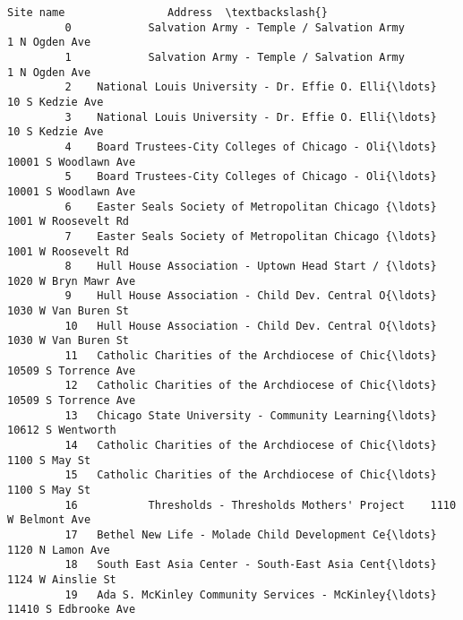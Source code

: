 \documentclass[11pt]{article}
\begin{document}
\begin{Verbatim}[commandchars=\\\{\}]
                                                     Site name                Address  \textbackslash{}
         0            Salvation Army - Temple / Salvation Army         1 N Ogden Ave    
         1            Salvation Army - Temple / Salvation Army         1 N Ogden Ave    
         2    National Louis University - Dr. Effie O. Elli{\ldots}       10 S Kedzie Ave    
         3    National Louis University - Dr. Effie O. Elli{\ldots}       10 S Kedzie Ave    
         4    Board Trustees-City Colleges of Chicago - Oli{\ldots}  10001 S Woodlawn Ave    
         5    Board Trustees-City Colleges of Chicago - Oli{\ldots}  10001 S Woodlawn Ave    
         6    Easter Seals Society of Metropolitan Chicago {\ldots}   1001 W Roosevelt Rd    
         7    Easter Seals Society of Metropolitan Chicago {\ldots}   1001 W Roosevelt Rd    
         8    Hull House Association - Uptown Head Start / {\ldots}  1020 W Bryn Mawr Ave    
         9    Hull House Association - Child Dev. Central O{\ldots}   1030 W Van Buren St    
         10   Hull House Association - Child Dev. Central O{\ldots}   1030 W Van Buren St    
         11   Catholic Charities of the Archdiocese of Chic{\ldots}  10509 S Torrence Ave    
         12   Catholic Charities of the Archdiocese of Chic{\ldots}  10509 S Torrence Ave    
         13   Chicago State University - Community Learning{\ldots}     10612 S Wentworth    
         14   Catholic Charities of the Archdiocese of Chic{\ldots}         1100 S May St    
         15   Catholic Charities of the Archdiocese of Chic{\ldots}         1100 S May St    
         16           Thresholds - Thresholds Mothers' Project    1110 W Belmont Ave    
         17   Bethel New Life - Molade Child Development Ce{\ldots}      1120 N Lamon Ave    
         18   South East Asia Center - South-East Asia Cent{\ldots}     1124 W Ainslie St    
         19   Ada S. McKinley Community Services - McKinley{\ldots}  11410 S Edbrooke Ave    
         

\end{Verbatim}
\end{document}
